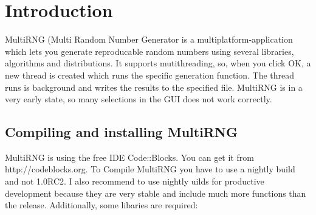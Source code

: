 \documentclass{scrartcl}
\begin{document}
\tableofcontents
\section{Introduction}
MultiRNG (Multi Random Number Generator is a multiplatform-application which lets you generate reproducable random numbers using several libraries, algorithms and distributions.\newline
It supports mutithreading, so, when you click OK, a new thread is created which runs the specific generation function. The thread runs is background and writes the results to the specified file.\newline
MultiRNG is in a very early state, so many selections in the GUI does not work correctly.
\subsection{Compiling and installing MultiRNG}
MultiRNG is using the free IDE Code::Blocks. You can get it from http://codeblocks.org. To Compile MultiRNG you have to use a nightly build and not 1.0RC2. I also recommend to use nightly uilds for productive development because they are very stable and include much more functions than the release.\newline
Additionally, some libaries are required:
\end{document}
